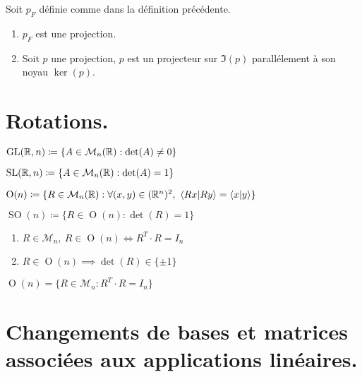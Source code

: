 \begin{proposition}
    Soit $p_F$ définie comme dans la définition précédente.
    \begin{enumerate}
        \item $p_F$ est une projection.
        \item Soit $p$ une projection, $p$ est un projecteur sur $\Im(p)$ parallélement à son noyau $\ker(p)$.
    \end{enumerate}
\end{proposition}

\section{Rotations.}
\begin{definition}
    $\operatorname{GL}(\mathbb{R}, n) \coloneqq \{ A \in \mathcal{M}_n(\mathbb{R}) : \det(A) \neq 0 \}$
\end{definition}

\begin{definition}
    $\operatorname{SL}(\mathbb{R}, n) \coloneqq \{ A \in \mathcal{M}_n(\mathbb{R}) : \det(A) = 1 \}$
\end{definition}

\begin{definition}
    $\operatorname{O}(n) \coloneqq \{ R \in \mathcal{M}_n(\mathbb{R}) : \forall (x, y) \in (\mathbb{R}^n)^2,\ \langle Rx|Ry \rangle = \langle x|y \rangle \}$
\end{definition}

\begin{definition}
    $\operatorname{SO}(n) \coloneqq \{ R \in \operatorname{O}(n) : \det(R) = 1 \}$
\end{definition}

\begin{proposition}
	\leavevmode
    \begin{enumerate}
        \item $R \in \mathcal{M}_n,\ R \in \operatorname{O}(n) \iff R^T \cdot R = I_n$
        \item $R \in \operatorname{O}(n) \implies \det(R) \in \{ \pm 1 \}$
    \end{enumerate}
\end{proposition}

\begin{corollary}
    $\operatorname{O}(n) = \{ R \in \mathcal{M}_n : R^T \cdot R = I_n \}$
\end{corollary}

\section{Changements de bases et matrices associées aux applications linéaires.}


